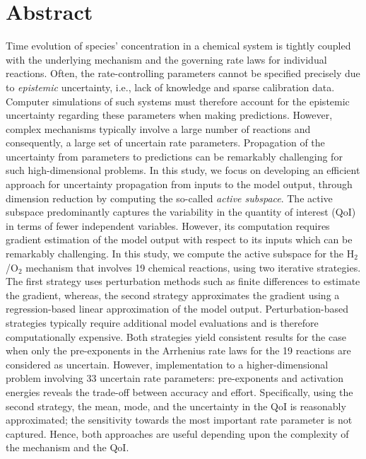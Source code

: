 \section*{Abstract}
Time evolution of species' concentration in a chemical system is tightly coupled
with the underlying mechanism and the governing rate laws for individual reactions.
Often, the rate-controlling parameters cannot be specified precisely 
due to \textit{epistemic} uncertainty, i.e., lack of knowledge and 
sparse calibration data. Computer simulations of such systems must
therefore account for the epistemic uncertainty regarding these parameters
when making predictions. However, complex mechanisms typically involve a large number of
reactions and consequently, a large set of uncertain rate parameters. Propagation of
the uncertainty from parameters to predictions can be remarkably challenging for
such high-dimensional problems. In this study, we focus on developing an efficient
approach for uncertainty propagation from inputs to the model output,
through dimension reduction by computing the
so-called
\textit{active subspace}. The active subspace
 predominantly captures the variability in the quantity of
interest (QoI) in terms of fewer independent variables. 
However, its computation requires gradient estimation of
the model output with respect to its inputs which can be
remarkably challenging. In this study, we compute the active subspace
for the H$_2$/O$_2$ mechanism that involves 19 chemical reactions,
using two iterative strategies. The first strategy uses perturbation methods
such as finite differences 
to estimate the gradient, whereas, the second strategy approximates the
gradient using a regression-based linear approximation of the model output.
Perturbation-based strategies typically require additional model 
evaluations  and 
is therefore computationally expensive. Both strategies yield consistent
results for the case when only the pre-exponents in the Arrhenius rate laws
for the 19 reactions are considered as uncertain. However, implementation 
to a higher-dimensional problem involving 33 uncertain rate parameters:
pre-exponents and activation energies reveals the trade-off between 
accuracy and effort. Specifically, using the second strategy,
the mean, mode, and the uncertainty
in the QoI is reasonably approximated; the sensitivity towards the most
important rate parameter is not captured. Hence, both approaches are
useful depending upon the complexity of the mechanism and the QoI.
